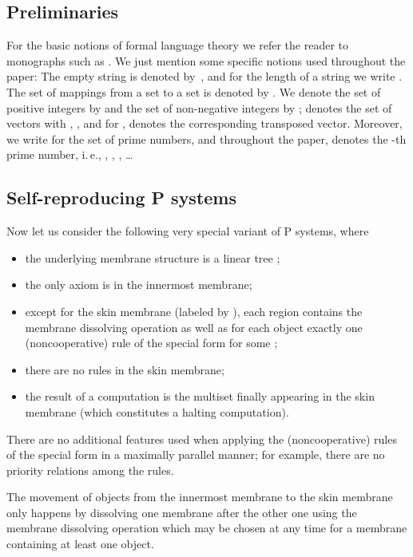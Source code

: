 \documentclass[copyright]{eptcs}
\begin{document}
\subsection{Preliminaries}

For the basic notions of formal language theory we refer the reader to
monographs such as \cite{handbook1997}. We just mention some specific 
notions used throughout the paper: The empty string is denoted 
by~, and for the length of a string  we write . The 
set of mappings from a set  to a set  is denoted by . We 
denote the set of positive integers by  and the set of 
non-negative integers by ;  denotes the set 
of vectors  with , , and for ,  denotes the 
corresponding transposed vector. Moreover, we write  for the 
set of prime numbers, and throughout the paper,  denotes the -th 
prime number, i.\,e., , , , \dots

\subsection{Self-reproducing P systems}

Now let us consider the following very special variant of P systems, where

\begin{itemize}
\item the underlying membrane structure is a linear tree ;

\item the only axiom is in the innermost membrane;

\item except for the skin membrane (labeled by ), each region 
contains the membrane dissolving operation  as well as for each
object  exactly one (noncooperative) rule of the special form  for some ;

\item there are no rules in the skin membrane;

\item the result of a computation is the multiset finally appearing in the
skin membrane (which constitutes a halting computation).
\end{itemize}

There are no additional features used when applying the (noncooperative)
rules of the special form  in a maximally parallel
manner; for example, there are no priority relations among the rules.

The movement of objects from the innermost membrane to the skin membrane
only happens by dissolving one membrane after the other one using the
membrane dissolving operation  which may be chosen at any time for
a membrane containing at least one object.
\end{document}
